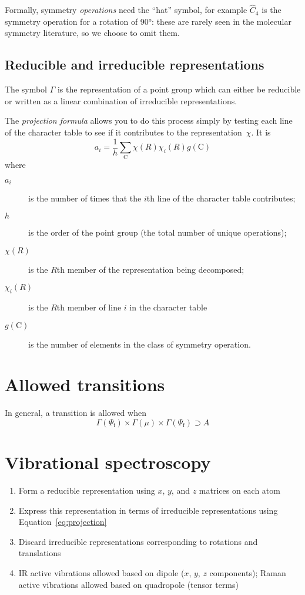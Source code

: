 \documentclass[12pt]{article}
\begin{document}
Formally, symmetry \emph{operations} need the \enquote{hat} symbol, for example
$\hat{C}_{4}$ is the symmetry operation for a rotation of \ang{90}: these are
rarely seen in the molecular symmetry literature, so we choose to omit them.

\subsection{Reducible and irreducible representations}

The symbol $\Gamma$ is the representation of a point group which can either be
reducible or written as a linear combination of irreducible representations.

The \emph{projection formula} allows you to do this process simply by testing
each line of the character table to see if it contributes to the
representation~$\chi$. It is
\begin{equation}
  a_{i} = \frac{1}{h}\sum_{\mathrm{C}}\chi(R)\chi_{i}(R)g(\mathrm{C})
  \label{eq:projection}
\end{equation}
where
\begin{description}
  \item[$a_{i}$] is the number of times that the $i$th line of the character
    table contributes;
  \item[$h$] is the order of the point group (the total number of unique
    operations);
  \item[$\chi(R)$] is the $R$th member of the representation being
    decomposed;
  \item[$\chi_{i}(R)$] is the $R$th member of line $i$ in the character
    table
  \item[$g(\mathrm{C})$] is the number of elements in the class
    of symmetry operation.
\end{description}

\section{Allowed transitions}

In general, a transition is allowed when
\[
 \Gamma(\Psi_{\mathrm{i}}) \times
 \Gamma(\mu) \times
 \Gamma(\Psi_{\mathrm{f}}) \supset A
\]

\section{Vibrational spectroscopy}

\begin{enumerate}
  \item Form a reducible representation using $x$, $y$, and $z$ matrices
    on each atom
  \item Express this representation in terms of irreducible representations
    using Equation~\ref{eq:projection}
  \item Discard irreducible representations corresponding to rotations
    and translations
  \item IR active vibrations allowed based on dipole ($x$, $y$, $z$ components);
    Raman active vibrations allowed based on quadropole (tensor terms)
\end{enumerate}
\end{document}
